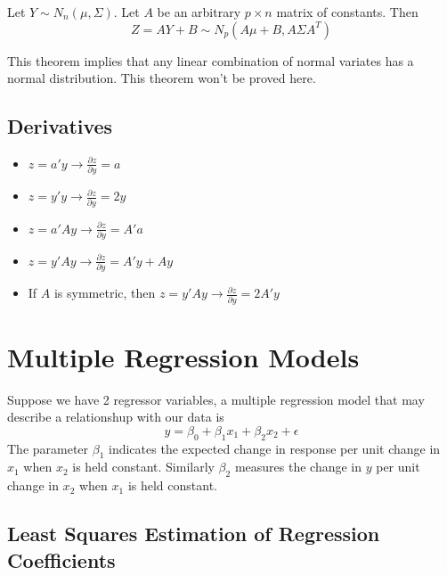 \begin{theorem}
    Let $Y \sim N_n(\mu, \Sigma)$. Let $A$ be an arbitrary $p \times n$ matrix of constants. Then 
    \[Z = AY + B \sim N_p(A\mu + B, A\Sigma A^T)\] 
\end{theorem}
This theorem implies that any linear combination of normal variates has a normal distribution. This theorem won't be proved here.

\subsection{Derivatives}

\begin{itemize}
    \item $z = a'y \rightarrow \frac{\partial z}{\partial y} = a$
    \item $z = y'y \rightarrow \frac{\partial z}{\partial y} = 2y$
    \item $z = a'Ay \rightarrow \frac{\partial z}{\partial y} = A'a$ 
    \item $z = y'Ay  \rightarrow \frac{\partial z}{\partial y} = A'y + Ay$
    \item If $A$ is symmetric, then $z = y'Ay  \rightarrow \frac{\partial z}{\partial y} = 2A'y$
\end{itemize}


\section{Multiple Regression Models}

Suppose we have 2 regressor variables, a multiple regression model that may describe a relationshup with our data is 
\[y = \beta_0 + \beta_1x_1 + \beta_2x_2 + \epsilon\]
The parameter $\beta_1$ indicates the expected change in response per unit change in $x_1$ when $x_2$ is held constant. Similarly $\beta_2$ measures the change in $y$ per unit change in $x_2$ when $x_1$ is held constant.  

\subsection{Least Squares Estimation of Regression Coefficients}

